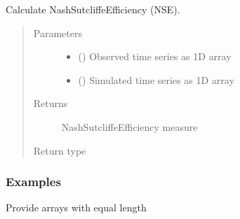\documentclass[letterpaper,10pt,english]{sphinxmanual}
\begin{document}
\begin{fulllineitems}
\label{\detokenize{reference/nse:de.nse.calc_nse}}
Calculate Nash\sphinxhyphen{}Sutcliffe\sphinxhyphen{}Efficiency (NSE).
\begin{quote}\begin{description}
\item[{Parameters}] \leavevmode\begin{itemize}
\item {} 
 (\sphinxstyleliteralemphasis{\sphinxupquote{(}}\sphinxstyleliteralemphasis{\sphinxupquote{,}}\sphinxstyleliteralemphasis{\sphinxupquote{)}}) \textendash{} Observed time series as 1\sphinxhyphen{}D array

\item {} 
 (\sphinxstyleliteralemphasis{\sphinxupquote{(}}\sphinxstyleliteralemphasis{\sphinxupquote{,}}\sphinxstyleliteralemphasis{\sphinxupquote{)}}) \textendash{} Simulated time series as 1\sphinxhyphen{}D array

\end{itemize}

\item[{Returns}] \leavevmode
{} \textendash{} Nash\sphinxhyphen{}Sutcliffe\sphinxhyphen{}Efficiency measure

\item[{Return type}] \leavevmode
{}

\end{description}\end{quote}
\subsubsection*{Examples}

Provide arrays with equal length


\end{fulllineitems}
\end{document}
